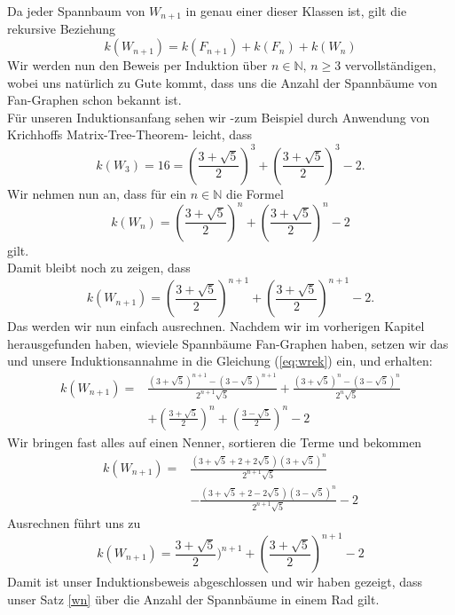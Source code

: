 Da jeder Spannbaum von $W_{n+1}$ in genau einer dieser Klassen ist, gilt die rekursive Beziehung
\begin{equation}
\mathit{k}(W_{n+1}) = \mathit{k}(F_{n+1}) + \mathit{k}(F_n) + \mathit{k}(W_n)
\label{eq:wrek}
\end{equation}
Wir werden nun den Beweis per Induktion über $n \in \mathbb{N}, \, n \geq 3$ vervollständigen, wobei uns natürlich zu Gute kommt, dass uns die Anzahl der Spannbäume von Fan-Graphen schon bekannt ist.\\
Für unseren Induktionsanfang sehen wir -zum Beispiel durch Anwendung von Krichhoffs Matrix-Tree-Theorem- leicht, dass \begin{equation}
\mathit{k}(W_3) = 16 = (\frac{3+\sqrt{5}}{2})^3+(\frac{3+\sqrt{5}}{2})^3-2.
\end{equation}
Wir nehmen nun an, dass für ein $n \in \mathbb{N}$ die Formel 
\begin{equation}
 \mathit{k}(W_n) = (\frac{3+\sqrt{5}}{2})^n+(\frac{3+\sqrt{5}}{2})^n-2
\end{equation}
gilt.\\
Damit bleibt noch zu zeigen, dass
\begin{equation}
 \mathit{k}(W_{n+1}) = (\frac{3+\sqrt{5}}{2})^{n+1}+(\frac{3+\sqrt{5}}{2})^{n+1}-2.
\end{equation}
Das werden wir nun einfach ausrechnen.
Nachdem wir im vorherigen Kapitel herausgefunden haben, wieviele Spannbäume Fan-Graphen haben, setzen wir das und unsere Induktionsannahme in die Gleichung (\ref{eq:wrek}) ein, und erhalten:\\
\begin{equation}
\begin{aligned}
\mathit{k}(W_{n+1}) ={} & \frac{(3+\sqrt{5})^{n+1}-(3-\sqrt{5})^{n+1}}{2^{n+1}\sqrt{5}} + \frac{(3+\sqrt{5})^{n}-(3-\sqrt{5})^{n}}{2^{n}\sqrt{5}}\\
& + (\frac{3+\sqrt{5}}{2})^n+(\frac{3-\sqrt{5}}{2})^n-2
\end{aligned}
\end{equation}
Wir bringen fast alles auf einen Nenner, sortieren die Terme und bekommen
\begin{equation}
\begin{aligned}
\mathit{k}(W_{n+1}) = {}  & \frac{(3+\sqrt{5}+2+2\sqrt{5})(3+\sqrt{5})^{n}}{2^{n+1}\sqrt{5}} \\
                        & -\frac{(3+\sqrt{5}+2-2\sqrt{5})(3-\sqrt{5})^{n}}{2^{n+1}\sqrt{5}}-2 
\end{aligned}
\end{equation}
Ausrechnen führt uns zu\\
\begin{equation}
\mathit{k}(W_{n+1}) = \frac{3+\sqrt{5}}{2})^{n+1}+(\frac{3+\sqrt{5}}{2})^{n+1}-2
\end{equation}
Damit ist unser Induktionsbeweis abgeschlossen und wir haben gezeigt, dass unser Satz \ref{wn} über die Anzahl der Spannbäume in einem Rad gilt.

